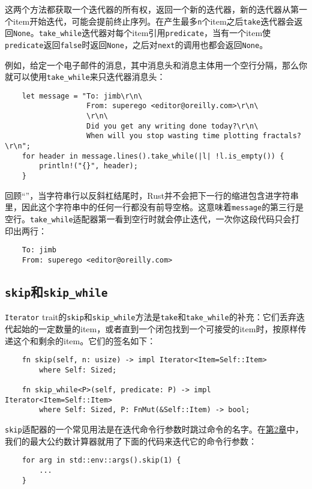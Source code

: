 这两个方法都获取一个迭代器的所有权，返回一个新的迭代器，新的迭代器从第一个item开始迭代，可能会提前终止序列。在产生最多\texttt{n}个item之后\texttt{take}迭代器会返回\texttt{None}。\texttt{take\_while}迭代器对每个item引用\texttt{predicate}，当有一个item使\texttt{predicate}返回\texttt{false}时返回\texttt{None}，之后对\texttt{next}的调用也都会返回\texttt{None}。

例如，给定一个电子邮件的消息，其中消息头和消息主体用一个空行分隔，那么你就可以使用\texttt{take\_while}来只迭代器消息头：
\begin{verbatim}
    let message = "To: jimb\r\n\
                   From: superego <editor@oreilly.com>\r\n\
                   \r\n\
                   Did you get any writing done today?\r\n\
                   When will you stop wasting time plotting fractals?\r\n";
    for header in message.lines().take_while(|l| !l.is_empty()) {
        println!("{}", header);
    }
\end{verbatim}

回顾“”，当字符串行以反斜杠结尾时，Rust并不会把下一行的缩进包含进字符串里，因此这个字符串中的任何一行都没有前导空格。这意味着\texttt{message}的第三行是空行。\texttt{take\_while}适配器第一看到空行时就会停止迭代，一次你这段代码只会打印出两行：
\begin{verbatim}
    To: jimb
    From: superego <editor@oreilly.com>
\end{verbatim}

\subsection{\texttt{skip}和\texttt{skip\_while}}
\texttt{Iterator} trait的\texttt{skip}和\texttt{skip\_while}方法是\texttt{take}和\texttt{take\_while}的补充：它们丢弃迭代起始的一定数量的item，或者直到一个闭包找到一个可接受的item时，按原样传递这个和剩余的item。它们的签名如下：
\begin{verbatim}
    fn skip(self, n: usize) -> impl Iterator<Item=Self::Item>
        where Self: Sized;

    fn skip_while<P>(self, predicate: P) -> impl Iterator<Item=Self::Item>
        where Self: Sized, P: FnMut(&Self::Item) -> bool;
\end{verbatim}

\texttt{skip}适配器的一个常见用法是在迭代命令行参数时跳过命令的名字。在\hyperref[ch02]{第2章}中，我们的最大公约数计算器就用了下面的代码来迭代它的命令行参数：
\begin{verbatim}
    for arg in std::env::args().skip(1) {
        ...
    }
\end{verbatim}


